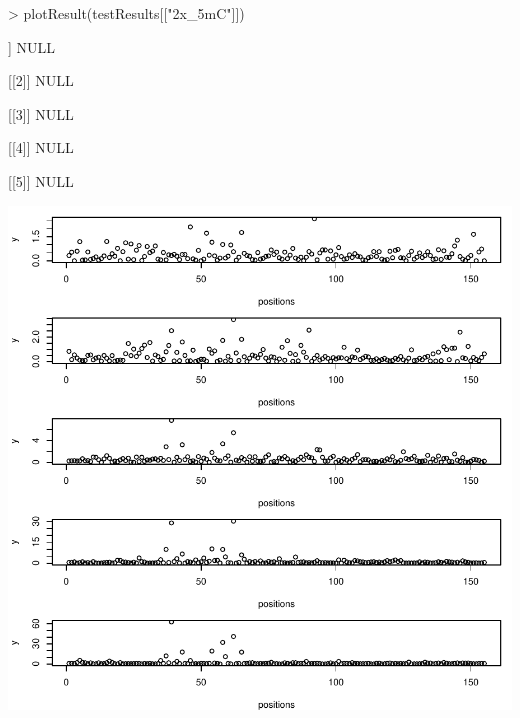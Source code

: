 \documentclass[letterpaper,12pt]{article}
\begin{document}
\begin{Schunk}
\begin{Sinput}
> plotResult(testResults[["2x_5mC"]])
\end{Sinput}
\begin{Soutput}
[[1]]
NULL

[[2]]
NULL

[[3]]
NULL

[[4]]
NULL

[[5]]
NULL
\end{Soutput}
\end{Schunk}
\includegraphics{plots/plots-008}
\end{document}
